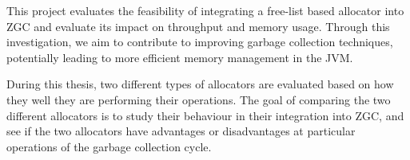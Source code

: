 This project evaluates the feasibility of integrating a free-list based allocator into ZGC and evaluate its impact on throughput and memory usage. Through this investigation, we aim to contribute to improving garbage collection techniques, potentially leading to more efficient memory management in the JVM.

During this thesis, two different types of allocators are evaluated based on how they well they are performing their operations. The goal of comparing the two different allocators is to study their behaviour in their integration into ZGC, and see if the two allocators have advantages or disadvantages at particular operations of the garbage collection cycle.
